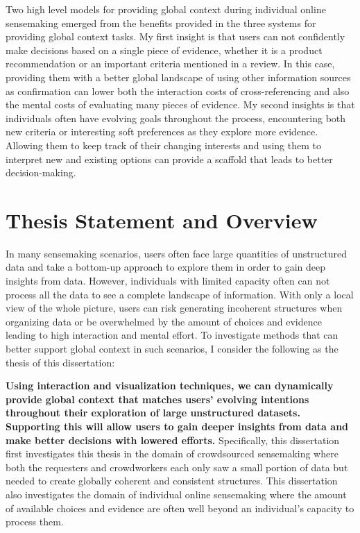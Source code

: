 Two high level models for providing global context during individual online sensemaking  emerged from the benefits provided in the three systems for providing global context tasks. My first insight is that users can not confidently make decisions based on a single piece of evidence, whether it is a product recommendation or an important criteria mentioned in a review. In this case, providing them with a better global landscape of using other information sources as confirmation can lower both the interaction costs of cross-referencing and also the mental costs of evaluating many pieces of evidence. My second insights is that individuals often have evolving goals throughout the process, encountering both new criteria or interesting soft preferences as they explore more evidence. Allowing them to keep track of their changing interests and using them to interpret new and existing options can provide a scaffold that leads to better decision-making. 

\section{Thesis Statement and Overview}

In many sensemaking scenarios, users often face large quantities of unstructured data and take a bottom-up approach to explore them in order to gain deep insights from data. However, individuals with limited capacity often can not process all the data to see a complete landscape of information. With only a local view of the whole picture, users can risk generating incoherent structures when organizing data or be overwhelmed by the amount of choices and evidence leading to high interaction and mental effort. To investigate methods that can better support global context in such scenarios, I consider the following as the thesis of this dissertation:

\textbf{Using interaction and visualization techniques, we can dynamically provide global context that matches users' evolving intentions throughout their exploration of large unstructured datasets. Supporting this will allow users to gain deeper insights from data and make better decisions with lowered efforts.} Specifically, this dissertation first investigates this thesis in the domain of crowdsourced sensemaking where both the requesters and crowdworkers each only saw a small portion of data but needed to create globally coherent and consistent structures. This dissertation also investigates the domain of individual online sensemaking where the amount of available choices and evidence are often well beyond an individual's capacity to process them.  

